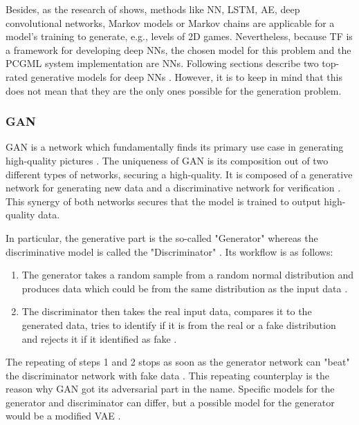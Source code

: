 \documentclass[MGS,Master,english]{twbook}%
\begin{document}
Besides, as the research of \cite{pcgml::paper} shows, methods like \ac{NN}, \ac{LSTM}, \ac{AE}, deep convolutional networks, Markov models or Markov chains are applicable for a model's training to generate, e.g., levels of \ac{2D} games. Nevertheless, because  \ac{TF} is a framework for developing deep \acp{NN}, the chosen model for this problem and the \ac{PCGML} system implementation are \acp{NN}. Following sections describe two top-rated generative models for deep \acp{NN} \cite{ml::vae::tutorial}. However, it is to keep in mind that this does not mean that they are the only ones possible for the generation problem.

\subsubsection{\acl{GAN}}
\ac{GAN} is a network which fundamentally finds its primary use case in generating high-quality pictures \cite{ml::book::developer}. The uniqueness of \ac{GAN} is its composition out of two different types of networks, securing a high-quality. It is composed of a generative network for generating new data and a discriminative network for verification \cite{ml::book::developer}. This synergy of both networks secures that the model is trained to output high-quality data. 

In particular, the generative part is the so-called "Generator" whereas the discriminative model is called the "Discriminator" \cite{ml::book::developer}. Its workflow is as follows:
\begin{enumerate}
	\item The generator takes a random sample from a random normal distribution and produces data which could be from the same distribution as the input data \cite{ml::book::developer}.
	\item The discriminator then takes the real input data, compares it to the generated data, tries to identify if it is from the real or a fake distribution and rejects it if it identified as fake \cite{ml::book::developer}.
\end{enumerate} 

The repeating of steps 1 and 2 stops as soon as the generator network can "beat" the discriminator network with fake data \cite{ml::book::developer}. This repeating counterplay is the reason why \ac{GAN} got its adversarial part in the name. Specific models for the generator and discriminator can differ, but a possible model for the generator would be a modified \ac{VAE} \cite{ml::book::nnProgrammingTF}.
\end{document}
